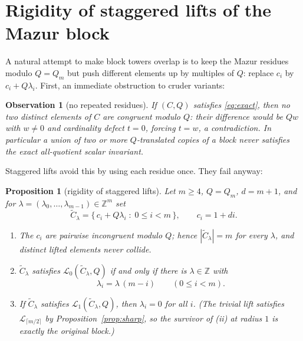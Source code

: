 \documentclass[11pt]{article}
\newtheorem{proposition}{Proposition}
\newtheorem{observation}[lemma]{Observation}
\theoremstyle{definition}
\theoremstyle{remark}
\newcommand{\Z}{\mathbb{Z}}
\newcommand{\loc}[1]{\mathcal{L}_{#1}}
\begin{document}
\section{Rigidity of staggered lifts of the Mazur block}\label{sec:rigidity}

A natural attempt to make block towers overlap is to keep the Mazur
residues modulo $Q=Q_m$ but push different elements up by multiples of
$Q$: replace $c_i$ by $c_i+Q\lambda_i$. First, an immediate obstruction
to cruder variants:

\begin{observation}[no repeated residues]\label{obs:dup}
If $(C,Q)$ satisfies \eqref{eq:exact}, then no two distinct elements of
$C$ are congruent modulo $Q$: their difference would be $Qw$ with
$w\ne0$ and cardinality defect $t=0$, forcing $t=w$, a contradiction. In
particular a union of two or more $Q$-translated copies of a block never
satisfies the exact all-quotient scalar invariant.
\end{observation}

Staggered lifts avoid this by using each residue once. They fail anyway:

\begin{proposition}[rigidity of staggered lifts]\label{prop:rigid}
Let $m\ge4$, $Q=Q_m$, $d=m+1$, and for
$\lambda=(\lambda_0,\dots,\lambda_{m-1})\in\Z^m$ set
\[
\widetilde C_\lambda=\{\,c_i+Q\lambda_i \;:\; 0\le i<m\,\},
\qquad c_i=1+di .
\]
\begin{enumerate}
\item[(i)] The $c_i$ are pairwise incongruent modulo $Q$; hence
$|\widetilde C_\lambda|=m$ for every $\lambda$, and distinct lifted
elements never collide.
\item[(ii)] $\widetilde C_\lambda$ satisfies
$\loc0(\widetilde C_\lambda,Q)$ if and only if there is $\lambda\in\Z$
with
\[
\lambda_i=\lambda\,(m-i)\qquad(0\le i<m).
\]
\item[(iii)] If $\widetilde C_\lambda$ satisfies
$\loc1(\widetilde C_\lambda,Q)$, then $\lambda_i=0$ for all $i$. (The
trivial lift satisfies $\loc{\lceil m/2\rceil}$ by
Proposition~\ref{prop:sharp}, so the survivor of (ii) at radius $1$ is
exactly the original block.)
\end{enumerate}
\end{proposition}
\end{document}
